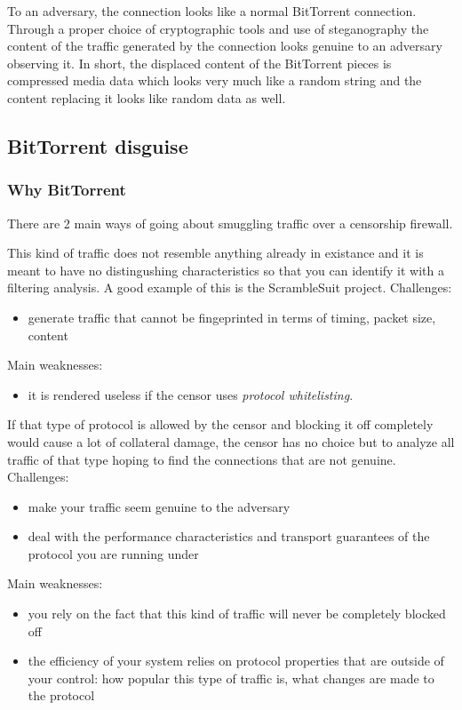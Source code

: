 \documentclass[11pt]{book} %
\begin{document}
To an adversary, the connection looks like a normal BitTorrent connection. Through a proper choice of cryptographic tools and use of steganography the content of the traffic generated by the connection looks genuine to an adversary observing it. In short, the displaced content of the BitTorrent pieces is compressed media data which looks very much like a random string and the content replacing it looks like random data as well.

\subsection{BitTorrent disguise}
\label{subsec:btDisguise}



\subsubsection{Why BitTorrent}
There are 2 main ways of going about smuggling traffic over a censorship firewall.


This kind of traffic does not resemble anything already in existance and it is meant to have no distingushing characteristics so that you can identify it with a filtering analysis. A good example of this is the ScrambleSuit project.
Challenges:
\begin{itemize}
\item generate traffic that cannot be fingeprinted in terms of timing, packet size, content
\end{itemize}
Main weaknesses:
\begin{itemize}
\item it is rendered useless if the censor uses \textit{protocol whitelisting}. 
\end{itemize}



If that type of protocol is allowed by the censor and blocking it off completely would cause a lot of collateral damage, the censor has no choice but to analyze all traffic of that type hoping to find the connections that 
are not genuine.
Challenges:
\begin{itemize}
\item make your traffic seem genuine to the adversary
\item deal with the performance characteristics and transport guarantees of the protocol you are running under
\end{itemize}
Main weaknesses:
\begin{itemize}
\item you rely on the fact that this kind of traffic will never be completely blocked off
\item the efficiency of your system relies on protocol properties that are outside of your control: how popular this type of traffic is, what changes are made to the protocol 
\end{itemize}
\end{document}
